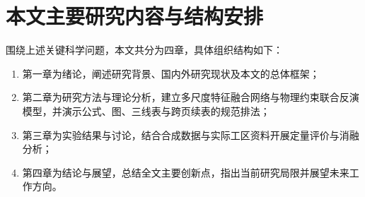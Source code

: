 \section{本文主要研究内容与结构安排}

围绕上述关键科学问题，本文共分为四章，具体组织结构如下：
\begin{enumerate}[label=（\arabic*）]
  \item 第一章为绪论，阐述研究背景、国内外研究现状及本文的总体框架；
  \item 第二章为研究方法与理论分析，建立多尺度特征融合网络与物理约束联合反演模型，并演示公式、图、三线表与跨页续表的规范排法；
  \item 第三章为实验结果与讨论，结合合成数据与实际工区资料开展定量评价与消融分析；
  \item 第四章为结论与展望，总结全文主要创新点，指出当前研究局限并展望未来工作方向。
\end{enumerate}
